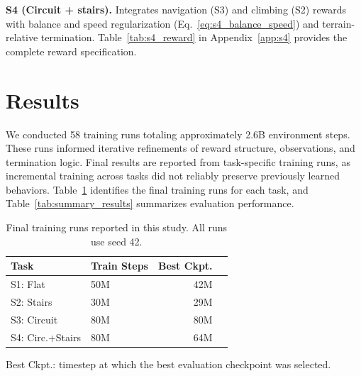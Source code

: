 \documentclass[conference]{IEEEtran}
\begin{document}
\textbf{S4 (Circuit + stairs).}
Integrates navigation (S3) and climbing (S2) rewards with balance and speed regularization (Eq.~\ref{eq:s4_balance_speed}) and terrain-relative termination. Table~\ref{tab:s4_reward} in Appendix~\ref{app:s4} provides the complete reward specification.


\section{Results}
\label{sec:results}

We conducted 58 training runs totaling approximately 2.6B environment steps. These runs informed iterative refinements of reward structure, observations, and termination logic. Final results are reported from task-specific training runs, as incremental training across tasks did not reliably preserve previously learned behaviors. Table~\ref{tab:final_runs} identifies the final training runs for each task, and Table~\ref{tab:summary_results} summarizes evaluation performance.

\begin{table}[h!]
\centering
\caption{Final training runs reported in this study. All runs use seed 42.}
\label{tab:final_runs}
\small
\begin{tabular}{@{}llrr@{}}
\toprule
\textbf{Task}  & \textbf{Train Steps} & \textbf{Best Ckpt.} \\
\midrule
S1: Flat                          & 50M & 42M \\
S2: Stairs       & 30M & 29M \\
S3: Circuit              & 80M & 80M \\
S4: Circ.+Stairs         & 80M & 64M \\
\bottomrule
\end{tabular}
\vspace{2pt}

{\raggedright\footnotesize Best Ckpt.: timestep at which the best evaluation checkpoint was selected.\par}
\end{table}
\end{document}
